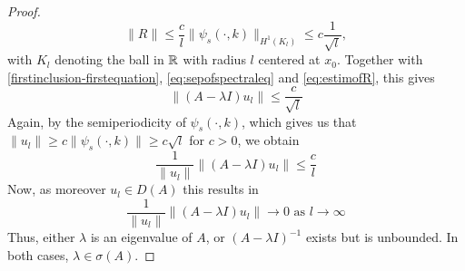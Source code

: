 \begin{theorem}
\begin{proof}
		\begin{equation}
			 \| R \| \leq \frac{c}{l} \| \psi_{s}(\cdot, k) \|_{H^{1}(K_{l})} \leq c \frac{1}{\sqrt{l}}, \label{eq:estimofR}
		\end{equation} %
		with $K_{l}$ denoting the ball in $\mathbb{R}$ with radius $l$ centered at $x_{0}$. Together with \eqref{firstinclusion-firstequation}, \eqref{eq:sepofspectraleq} and \eqref{eq:estimofR}, this gives
		\[ \| (A - \lambda I) u_{l} \| \leq \frac{c}{\sqrt{l}} \]
		Again, by the semiperiodicity of $\psi_{s}(\cdot, k)$, which gives us that $\| u_{l} \| \geq c \| \psi_{s}(\cdot, k) \| \geq c \sqrt{l}$ for $c > 0$, we obtain
		\[ \frac{1}{\|u_{l}\|}\| (A - \lambda I) u_{l} \| \leq \frac{c}{l} \]
		Now, as moreover $u_{l} \in D(A)$ this results in
			\[ \frac{1}{\|u_{l} \|} \| (A - \lambda I) u_{l} \| \rightarrow 0 \text{ as } l \rightarrow \infty \]
		Thus, either $\lambda$ is an eigenvalue of $A$, or $(A - \lambda I)^{-1}$ exists but is unbounded. In both cases, $\lambda \in \sigma(A)$.
	\end{proof}
\end{theorem}	

